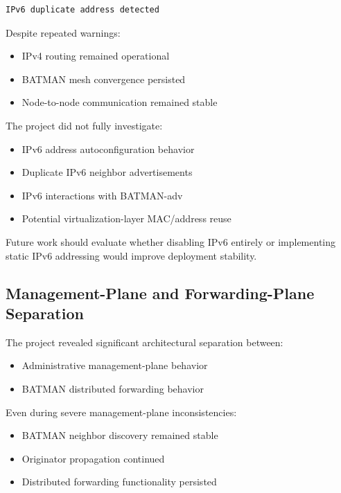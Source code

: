 \documentclass[conference]{IEEEtran}
\begin{document}
\begin{lstlisting}
IPv6 duplicate address detected
\end{lstlisting}

Despite repeated warnings:

\begin{itemize}
    \item IPv4 routing remained operational
    \item BATMAN mesh convergence persisted
    \item Node-to-node communication remained stable
\end{itemize}

The project did not fully investigate:

\begin{itemize}
    \item IPv6 address autoconfiguration behavior
    \item Duplicate IPv6 neighbor advertisements
    \item IPv6 interactions with BATMAN-adv
    \item Potential virtualization-layer MAC/address reuse
\end{itemize}

Future work should evaluate whether disabling IPv6 entirely or implementing static IPv6 addressing would improve deployment stability.

\subsection{Management-Plane and Forwarding-Plane Separation}

The project revealed significant architectural separation between:

\begin{itemize}
    \item Administrative management-plane behavior
    \item BATMAN distributed forwarding behavior
\end{itemize}

Even during severe management-plane inconsistencies:

\begin{itemize}
    \item BATMAN neighbor discovery remained stable
    \item Originator propagation continued
    \item Distributed forwarding functionality persisted
\end{itemize}
\end{document}
